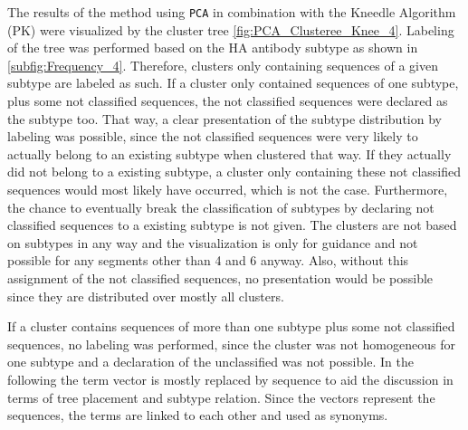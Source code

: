 \vspace{1em}

The results of the method using \texttt{PCA} in combination with the Kneedle Algorithm (PK) were visualized by the cluster tree \autoref{fig:PCA_Clusteree_Knee_4}. Labeling of the tree was performed based on the \gls{HA} antibody subtype as shown in \autoref{subfig:Frequency_4}. Therefore, clusters only containing sequences of a given subtype are labeled as such. If a cluster only contained sequences of one subtype, plus some not classified sequences, the not classified sequences were declared as the subtype too. That way, a clear presentation of the subtype distribution by labeling was possible, since the not classified sequences were very likely to actually belong to an existing subtype when clustered that way. If they actually did not belong to a existing subtype, a cluster only containing these not classified sequences would most likely have occurred, which is not the case. Furthermore, the chance to eventually break the classification of subtypes by declaring not classified sequences to a existing subtype is not given. The clusters are not based on subtypes in any way and the visualization is only for guidance and not possible for any segments other than 4 and 6 anyway. Also, without this assignment of the not classified sequences, no presentation would be possible since they are distributed over mostly all clusters.

\vspace{1em}

If a cluster contains sequences of more than one subtype plus some not classified sequences, no labeling was performed, since the cluster was not homogeneous for one subtype and a declaration of the unclassified was not possible. In the following the term vector is mostly replaced by sequence to aid the discussion in terms of tree placement and subtype relation. Since the vectors represent the sequences, the terms are linked to each other and used as synonyms. %


